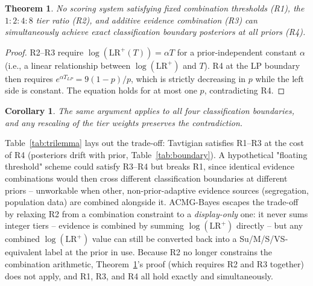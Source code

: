 \documentclass[11pt]{article}
\newtheorem{theorem}{Theorem}
\newtheorem{corollary}{Corollary}
\newcommand{\lrp}{\mathrm{LR}^{+}}
\begin{document}
\begin{theorem}
\label{thm:main}
No scoring system satisfying fixed combination thresholds \textup{(R1)},
the $1{:}2{:}4{:}8$ tier ratio \textup{(R2)}, and additive evidence
combination \textup{(R3)} can simultaneously achieve exact classification
boundary posteriors at all priors \textup{(R4)}.
\end{theorem}

\begin{proof}
R2--R3 require $\log(\lrp(T)) = \alpha T$ for a prior-independent constant
$\alpha$ (i.e., a linear relationship between $\log(\lrp)$ and $T$).
R4 at the LP boundary then requires $e^{\alpha T_{LP}} = 9(1-p)/p$, which
is strictly decreasing in $p$ while the left side is constant.
The equation holds for at most one $p$, contradicting R4.
\end{proof}

\begin{corollary}
The same argument applies to all four classification boundaries, and any
rescaling of the tier weights preserves the contradiction.
\end{corollary}

Table~\ref{tab:trilemma} lays out the trade-off: Tavtigian satisfies R1--R3
at the cost of R4 (posteriors drift with prior, Table~\ref{tab:boundary}).
A hypothetical "floating threshold" scheme could satisfy R3--R4 but breaks
R1, since identical evidence combinations would then cross different
classification boundaries at different priors -- unworkable when other,
non-prior-adaptive evidence sources (segregation, population data) are
combined alongside it. ACMG-Bayes escapes the trade-off by relaxing R2 from
a combination constraint to a \emph{display-only} one: it never sums
integer tiers -- evidence is combined by summing $\log(\lrp)$ directly --
but any combined $\log(\lrp)$ value can still be converted back into a
Su/M/S/VS-equivalent label at the prior in use. Because R2 no longer
constrains the combination arithmetic, Theorem~\ref{thm:main}'s proof
(which requires R2 and R3 together) does not apply, and R1, R3, and R4 all
hold exactly and simultaneously.
\end{document}
